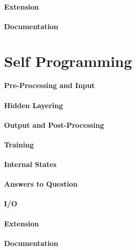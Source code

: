 \documentclass[12pt]{article}
\begin{document}
\paragraph*{Extension}

\paragraph*{Documentation}



\section{Self Programming}
\paragraph*{Pre-Processing and Input}

\paragraph*{Hidden Layering}

\paragraph*{Output and Post-Processing}

\paragraph*{Training}

\paragraph*{Internal States}

\paragraph*{Answers to Question}

\paragraph*{I/O}

\paragraph*{Extension}

\paragraph*{Documentation}

\end{document}
